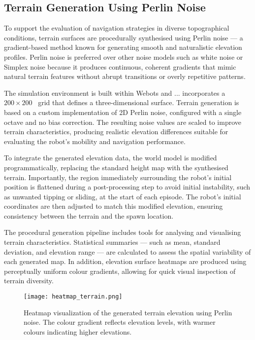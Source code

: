 \documentclass[conference]{IEEEtran}
\begin{document}
\subsection{Terrain Generation Using Perlin Noise}

To support the evaluation of navigation strategies in diverse topographical conditions, terrain surfaces are procedurally synthesised using Perlin noise — a gradient-based method known for generating smooth and naturalistic elevation profiles. Perlin noise is preferred over other noise models such as white noise or Simplex noise because it produces continuous, coherent gradients that mimic natural terrain features without abrupt transitions or overly repetitive patterns.

The simulation environment is built within Webots and ... incorporates a \(200 \times 200\)~ grid that defines a three-dimensional surface. Terrain generation is based on a custom implementation of 2D Perlin noise, configured with a single octave and no bias correction. The resulting noise values are scaled to improve terrain characteristics, producing realistic elevation differences suitable for evaluating the robot's mobility and navigation performance.

To integrate the generated elevation data, the world model is modified programmatically, replacing the standard height map with the synthesised terrain. Importantly, the region immediately surrounding the robot's initial position is flattened during a post-processing step to avoid initial instability, such as unwanted tipping or sliding, at the start of each episode. The robot's initial coordinates are then adjusted to match this modified elevation, ensuring consistency between the terrain and the spawn location.

The procedural generation pipeline includes tools for analysing and visualising terrain characteristics. Statistical summaries — such as mean, standard deviation, and elevation range — are calculated to assess the spatial variability of each generated map. In addition, elevation surface heatmaps are produced using perceptually uniform colour gradients, allowing for quick visual inspection of terrain diversity.

\begin{figure}[htbp]
    \centering
    \texttt{[image: heatmap\_terrain.png]}
    \caption{Heatmap visualization of the generated terrain elevation using Perlin noise. The colour gradient reflects elevation levels, with warmer colours indicating higher elevations.}
    \label{fig:heatmap_terrain}
\end{figure}
\end{document}
